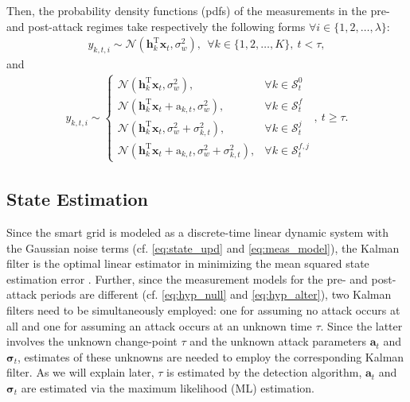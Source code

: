 \documentclass[onecolumn]{IEEEtran}
\begin{document}
Then, the probability density functions (pdfs) of the measurements in the pre- and post-attack regimes take respectively the following forms $\forall i \in \{1,2,\dots,\lambda\}$:
\begin{align} \label{eq:hyp_null}
y_{k,t,i} \sim \mathbf{\mathcal{N}}(\mathbf{h}_k^\mathrm{T} \mathbf{x}_t,\sigma_w^2), ~~ \forall k \in \{1,2,\dots,K\}, ~ t < \tau,
\end{align}
and
\begin{align} \label{eq:hyp_alter}
y_{k,t,i} \sim
\begin{cases}
    \mathbf{\mathcal{N}}(\mathbf{h}_k^\mathrm{T} \mathbf{x}_t,\sigma_w^2), & \forall k \in \mathcal{S}_t^0 \\
    \mathbf{\mathcal{N}}(\mathbf{h}_k^\mathrm{T} \mathbf{x}_t + \mathrm{a}_{k,t},\sigma_w^2), & \forall k \in \mathcal{S}_t^f \\
    \mathbf{\mathcal{N}}(\mathbf{h}_k^\mathrm{T} \mathbf{x}_t,\sigma_w^2 + \sigma_{k,t}^2), & \forall k \in \mathcal{S}_t^j \\
    \mathbf{\mathcal{N}}(\mathbf{h}_k^\mathrm{T} \mathbf{x}_t + \mathrm{a}_{k,t},\sigma_w^2 + \sigma_{k,t}^2), & \forall k \in \mathcal{S}_t^{f,j}
  \end{cases}
  ,~ t \geq \tau.
\end{align}

\subsection{State Estimation}

Since the smart grid is modeled as a discrete-time linear dynamic system with the Gaussian noise terms (cf. \eqref{eq:state_upd} and \eqref{eq:meas_model}), the Kalman filter is the optimal linear estimator in minimizing the mean squared state estimation error \cite{Kalman_60}. Further, since the measurement models for the pre- and post-attack periods are different (cf. \eqref{eq:hyp_null} and \eqref{eq:hyp_alter}), two Kalman filters need to be simultaneously employed: one for assuming no attack occurs at all and one for  assuming an attack occurs at an unknown time $\tau$. Since the latter involves the unknown change-point $\tau$ and the unknown attack parameters $\mathbf{a}_t$ and $\pmb{\sigma}_t$, estimates of these unknowns are needed to employ the corresponding Kalman filter. As we will explain later, $\tau$ is estimated by the detection algorithm, $\mathbf{a}_t$ and $\pmb{\sigma}_t$ are estimated via the maximum likelihood (ML) estimation.
\end{document}
